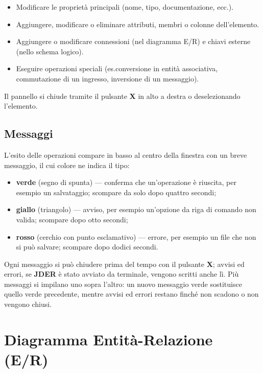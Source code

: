 \documentclass[a4paper,11pt]{article}
\newcommand{\jder}{\textbf{JDER}}
\begin{document}
\begin{itemize}
  \item Modificare le proprietà principali (nome, tipo, documentazione, ecc.).
  \item Aggiungere, modificare o eliminare attributi, membri o colonne dell'elemento.
  \item Aggiungere o modificare connessioni (nel diagramma E/R) e chiavi esterne (nello schema
        logico).
  \item Eseguire operazioni speciali (es.\@ conversione in entità associativa, commutazione di un
        ingresso, inversione di un messaggio).
\end{itemize}

Il pannello si chiude tramite il pulsante \textbf{X} in alto a destra o deselezionando
l'elemento.

\subsection{Messaggi}
\label{sec:messaggi}

L'esito delle operazioni compare in basso al centro della finestra con un breve messaggio, il cui
colore ne indica il tipo:

\begin{itemize}
  \item \textbf{verde} (segno di spunta) --- conferma che un'operazione è riuscita, per esempio un
        salvataggio; scompare da solo dopo quattro secondi;
  \item \textbf{giallo} (triangolo) --- avviso, per esempio un'opzione da riga di comando non
        valida; scompare dopo otto secondi;
  \item \textbf{rosso} (cerchio con punto esclamativo) --- errore, per esempio un file che non si
        può salvare; scompare dopo dodici secondi.
\end{itemize}

Ogni messaggio si può chiudere prima del tempo con il pulsante \textbf{X}; avvisi ed errori, se
\jder{} è stato avviato da terminale, vengono scritti anche lì. Più messaggi si impilano uno sopra
l'altro: un nuovo messaggio verde sostituisce quello verde precedente, mentre avvisi ed errori
restano finché non scadono o non vengono chiusi.

\Needspace{14cm}
\section{Diagramma Entità-Relazione (E/R)}
\label{sec:er}
\end{document}
